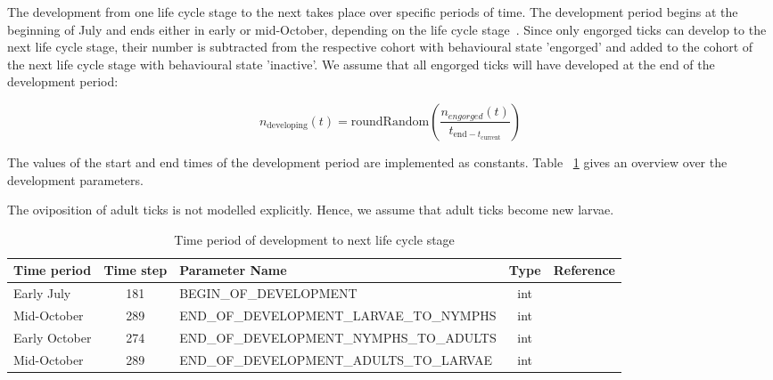 \documentclass[a4paper, 11pt]{scrartcl}
\begin{document}
The development from one life cycle stage to the next takes place over specific periods of time. The development period begins at the beginning of July and ends either in early
or mid-October, depending on the life cycle stage~\parencite{tba}. Since only engorged ticks can develop to the next life cycle stage, their number is subtracted from the
respective cohort with behavioural state 'engorged' and added to the cohort of the next life cycle stage with behavioural state 'inactive'. We assume that all engorged ticks will have
developed at the end of the development period:

\begin{equation}
n_{\text{developing}}(t) = \text{roundRandom}(\frac{n_{engorged}(t)}{t_{\text{end} - t_{\text{current}}}})
\end{equation}

The values of the start and end times of the development period are implemented as constants. Table ~\ref{tab:development_parameters} gives an overview over the
development parameters.

The oviposition of adult ticks is not modelled explicitly. Hence, we assume that adult ticks become new larvae.

\begin{table}[h!]
\caption{Time period of development to next life cycle stage}
\label{tab:development_parameters}
\begin{tabularx}{\textwidth}{lclcl}
\toprule
\textbf{Time period} 	& \textbf{Time step} & \textbf{Parameter Name}							& \textbf{Type}    & \textbf{Reference} \\
\midrule
Early July   			& 181   			 & \tiny{BEGIN\_OF\_DEVELOPMENT}					& int      & ~\cite{tba}   		\\
Mid-October     		& 289      			 & \tiny{END\_OF\_DEVELOPMENT\_LARVAE\_TO\_NYMPHS}	& int      & ~\cite{tba}      	\\
Early October    		& 274    			 & \tiny{END\_OF\_DEVELOPMENT\_NYMPHS\_TO\_ADULTS}	& int      & ~\cite{tba}     	\\
Mid-October     		& 289      			 & \tiny{END\_OF\_DEVELOPMENT\_ADULTS\_TO\_LARVAE}	& int      & ~\cite{tba}        \\
\bottomrule
\end{tabularx}
\end{table}
\end{document}
